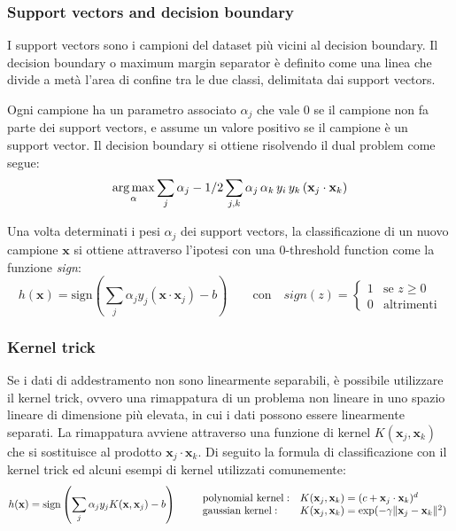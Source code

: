 \subsubsection*{Support vectors and decision boundary}
I support vectors sono i campioni del dataset più vicini al decision boundary. Il decision boundary o maximum margin separator
è definito come una linea che divide a metà l'area di confine tra le due classi, delimitata dai support vectors.

Ogni campione ha un parametro associato \(\alpha_j\) che vale 0 se il campione non fa parte dei support vectors, e assume
un valore positivo se il campione è un support vector. Il decision boundary si ottiene risolvendo il dual problem come segue:
\[\operatorname*{arg\,max}_\alpha \sum_j \alpha_j - 1/2 \sum_{j,k} \alpha_j \, \alpha_k \, y_i \, y_k \, (\textbf{x}_j \cdot \textbf{x}_k)\]

Una volta determinati i pesi \(\alpha_j\) dei support vectors, la classificazione di un nuovo campione \(\textbf{x}\) si ottiene
attraverso l'ipotesi con una 0-threshold function come la funzione \textit{sign}:
\[h(\textbf{x}) = \text{sign}\left(\sum_j \alpha_j y_j (\textbf{x} \cdot \textbf{x}_j) - b\right) \qquad \text{con} \quad \textit{sign}(z) = \begin{cases} 1 & \text{se } z \ge 0 \\ 0 & \text{altrimenti} \end{cases}\]

\subsubsection*{Kernel trick}
Se i dati di addestramento non sono linearmente separabili, è possibile utilizzare il kernel trick, ovvero una rimappatura di
un problema non lineare in uno spazio lineare di dimensione più elevata, in cui i dati possono essere linearmente separati.
La rimappatura avviene attraverso una funzione di kernel \(K(\textbf{x}_j, \textbf{x}_k)\) che si sostituisce al prodotto
\(\textbf{x}_j \cdot \textbf{x}_k\). Di seguito la formula di classificazione con il kernel trick ed alcuni esempi di kernel
utilizzati comunemente:
\[h(\textbf{x}) = \text{sign}\left(\sum_j \alpha_j y_j K(\textbf{x}, \textbf{x}_j) - b\right) \qquad \begin{array}{l l}
	\text{polynomial kernel}: & K(\textbf{x}_j, \textbf{x}_k) = (c + \textbf{x}_j \cdot \textbf{x}_k)^d \\
	\text{gaussian kernel}: & K(\textbf{x}_j, \textbf{x}_k) = \exp(-\gamma \|\textbf{x}_j - \textbf{x}_k\|^2)
\end{array}\]
